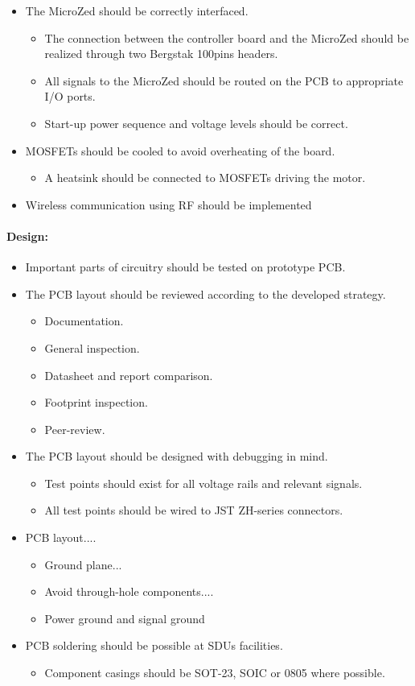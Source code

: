 \begin{itemize}
	\item The MicroZed should be correctly interfaced.
	\begin{itemize}
		\item The connection between the controller board and the MicroZed should be realized through two Bergstak 100pins headers.
		\item All signals to the MicroZed should be routed on the PCB to appropriate I/O ports.
		\item Start-up power sequence and voltage levels should be correct.
	\end{itemize}
	\item MOSFETs should be cooled to avoid overheating of the board.
	\begin{itemize}
		\item A heatsink should be connected to MOSFETs driving the motor.
	\end{itemize}
	\item Wireless communication using RF should be implemented
\end{itemize}


\paragraph{Design:}
\begin{itemize}
	\item Important parts of circuitry should be tested on prototype PCB.
	\item The PCB layout should be reviewed according to the developed strategy.
	\begin{itemize}
		\item Documentation.
		\item General inspection.
		\item Datasheet and report comparison.
		\item Footprint inspection.
		\item Peer-review.
	\end{itemize}
	\item The PCB layout should be designed with debugging in mind.
	\begin{itemize}
		\item Test points should exist for all voltage rails and relevant signals.
		\item All test points should be wired to JST ZH-series connectors.
	\end{itemize}
	\item PCB layout....
	\begin{itemize}
		\item Ground plane...
		\item Avoid through-hole components....
		\item Power ground and signal ground
	\end{itemize}
	\item PCB soldering should be possible at SDUs facilities.
	\begin{itemize}
		\item Component casings should be SOT-23, SOIC or 0805 where possible.
	\end{itemize}
\end{itemize}

